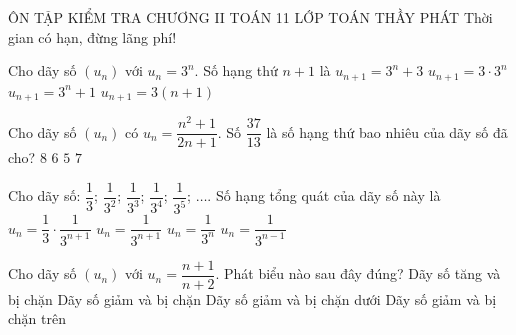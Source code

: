 \def\tenchude{ÔN TẬP KIỂM TRA CHƯƠNG II}
\begin{name}
	{\tenchude}
	{TOÁN 11}
	{LỚP TOÁN THẦY PHÁT}
	{Thời gian có hạn, đừng lãng phí!}
\end{name}
\TN
\begin{ex}%
	Cho dãy số $(u_n)$ với $u_n=3^n$. Số hạng thứ $n+1$ là
	\choice
	{$u_{n+1}=3^n+3$}
	{\True $u_{n+1}=3\cdot 3^n$}
	{$u_{n+1}=3^n+1$}
	{$u_{n+1}=3(n+1)$}
\end{ex}
\begin{ex}%
	Cho dãy số $(u_n)$ có $u_n=\dfrac{n^2+1}{2n+1}$. Số $\dfrac{37}{13}$ là số hạng thứ bao nhiêu của dãy số đã cho?
	\choice
	{$8$}
	{\True $6$}
	{$5$}
	{$7$}
\end{ex}
\begin{ex}%
	Cho dãy số: $\dfrac{1}{3}$; $\dfrac{1}{3^2}$; $\dfrac{1}{3^3}$; $\dfrac{1}{3^4}$; $\dfrac{1}{3^5}$; $\ldots$. Số hạng tổng quát của dãy số này là
	\choice
	{$u_n=\dfrac{1}{3}\cdot \dfrac{1}{3^{n+1}}$}
	{$u_n=\dfrac{1}{3^{n+1}}$}
	{\True $u_n=\dfrac{1}{3^n}$}
	{$u_n=\dfrac{1}{3^{n-1}}$}
\end{ex}
\begin{ex}%
	Cho dãy số $(u_n)$ với $u_n=\dfrac{n+1}{n+2}$. Phát biểu nào sau đây đúng?
	\choice
	{\True Dãy số tăng và bị chặn}
	{Dãy số giảm và bị chặn}
	{Dãy số giảm và bị chặn dưới}
	{Dãy số giảm và bị chặn trên}
\end{ex}
